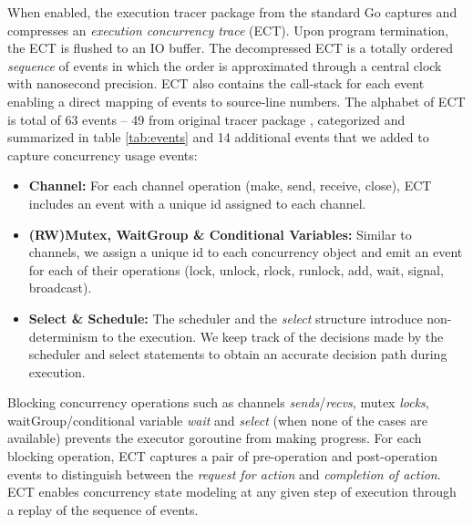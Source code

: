 When enabled, the execution tracer package from the standard Go captures and compresses an \textit{execution concurrency trace} (ECT).
%
Upon program termination, the ECT is flushed to an IO buffer.
%
The decompressed ECT is a totally ordered \textit{sequence} of events in which the order is approximated through a central clock with nanosecond precision.
%
ECT also contains the call-stack for each event enabling a direct mapping of events to source-line numbers.
%
The alphabet of ECT is total of 63 events -- 49 from original tracer package \cite{goParserSource}, categorized and summarized in table \ref{tab:events} and 14 additional events that we added to capture concurrency usage events:
%
\begin{itemize}
    \item \textbf{Channel:} For each channel operation (make, send, receive, close), ECT includes an event with a unique id assigned to each channel.
    \item \textbf{(RW)Mutex, WaitGroup \& Conditional Variables:} Similar to channels, we assign a unique id to each concurrency object and emit an event for each of their operations (lock, unlock, rlock, runlock, add, wait, signal, broadcast).
    \item \textbf{Select \& Schedule:} The scheduler and the \textit{select} structure introduce non-determinism to the execution. We keep track of the decisions made by the scheduler and select statements to obtain an accurate decision path during execution.
\end{itemize}

Blocking concurrency operations such as channels \textit{sends}/\textit{recvs}, mutex \textit{locks}, waitGroup/conditional variable \textit{wait} and \textit{select} (when none of the cases are available) prevents the executor goroutine from making progress.
%
For each blocking operation, ECT captures a pair of pre-operation and post-operation events to distinguish between the \textit{request for action} and \textit{completion of action}.
%
ECT enables concurrency state modeling at any given step of execution through a replay of the sequence of events.
%

